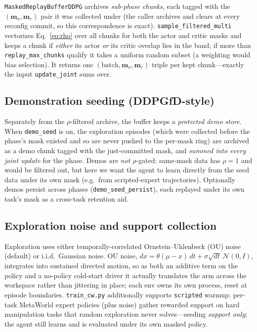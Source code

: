 \documentclass[11pt]{article}
\newcommand{\mask}{\bm{m}}                 %
\newcommand{\code}[1]{\texttt{\small #1}}
\begin{document}
\code{MaskedReplayBufferDDPG} archives \emph{sub-phase chunks}, each tagged with
the $(\mask_a,\mask_c)$ pair it was collected under (the caller archives and clears
at every reconfig commit, so this correspondence is exact).
\code{sample\_filtered\_multi} vectorizes Eq.~\eqref{eq:rho} over all chunks for
both the actor and critic masks and keeps a chunk if \emph{either} its actor
\emph{or} its critic overlap lies in the band; if more than
\code{replay\_max\_chunks} qualify it takes a uniform random subset (a weighting
would bias selection). It returns one $(\text{batch},\mask_a,\mask_c)$ triple per
kept chunk---exactly the input \code{update\_joint} sums over.

\subsection{Demonstration seeding (DDPGfD-style)}
\label{sec:ddpg-demo}

Separately from the $\rho$-filtered archive, the buffer keeps a \emph{protected
demo store}. When \code{demo\_seed} is on, the exploration episodes (which were
collected before the phase's mask existed and so are never pushed to the per-mask
ring) are archived as a demo chunk tagged with the just-committed mask, and
\emph{summed into every joint update} for the phase. Demos are \emph{not}
$\rho$-gated: same-mask data has $\rho=1$ and would be filtered out, but here we
want the agent to learn directly from the seed data under its own mask (e.g.\ from
scripted-expert trajectories). Optionally demos persist across phases
(\code{demo\_seed\_persist}), each replayed under its own task's mask as a
cross-task retention aid.

\subsection{Exploration noise and support collection}
\label{sec:ddpg-noise}

Exploration uses either temporally-correlated Ornstein--Uhlenbeck (OU) noise
(default) or i.i.d.\ Gaussian noise. OU noise,
$dx = \theta(\mu-x)\,dt + \sigma\sqrt{dt}\,\mathcal N(0,I)$, integrates into
sustained directed motion, so as both an additive term on the policy and a
no-policy cold-start driver it actually translates the arm across the workspace
rather than jittering in place; each env owns its own process, reset at episode
boundaries. \code{train\_cw.py} additionally supports \code{scripted} warmup:
per-task MetaWorld expert policies (plus noise) gather rewarded support on hard
manipulation tasks that random exploration never solves---seeding \emph{support
only}; the agent still learns and is evaluated under its own masked policy.
\end{document}
